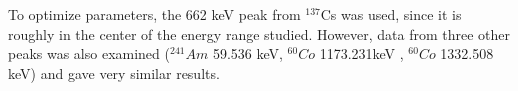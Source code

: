 To optimize parameters, the 662 keV peak from $^{137}$Cs was used, since it is roughly in the center of the energy range studied. However, data from three other peaks was also examined (${}^{241}Am$ 59.536 keV, ${}^{60}Co$ 1173.231keV , ${}^{60}Co$ 1332.508 keV) and gave very similar results.

